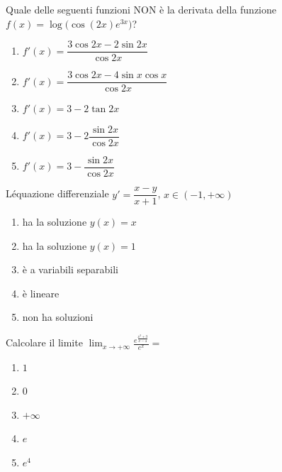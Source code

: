 \begin{quiz}
Quale delle seguenti funzioni NON \`e la derivata della funzione $f(x)=\log\bigl(\cos(2x)e^{3x}\bigr)$?
\begin{enumerate}
\item $f\prime(x)=\dfrac{3\cos2x-2\sin2x}{\cos2x}$
\item $f\prime(x)=\dfrac{3\cos2x-4\sin x\cos x}{\cos2x}$
\item $f\prime(x)=3-2\tan2x$
\item $f\prime(x)=3-2\dfrac{\sin2x}{\cos2x}$
\item $f\prime(x)=3-\dfrac{\sin2x}{\cos2x}$
\end{enumerate}
\end{quiz}

\begin{quiz}
L\'equazione differenziale $y\prime=\dfrac{x-y}{x+1}$, $x\in(-1,+\infty)$
\begin{enumerate}
\item ha la soluzione $y(x)=x$
\item ha la soluzione $y(x)=1$
\item \`e a variabili separabili
\item \`e lineare
\item non ha soluzioni
\end{enumerate}
\end{quiz}

\begin{quiz}
Calcolare il limite $\displaystyle\lim_{x\to+\infty}\frac{e^{\frac{x^2+3}{x-4}}}{e^x}=$
\begin{enumerate}
\item $1$
\item $0$
\item $+\infty$
\item $e$
\item $e^4$
\end{enumerate}
\end{quiz}

